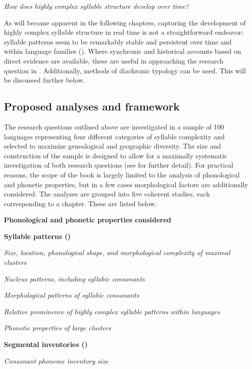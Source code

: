 \ea\label{ex:1.24}
   \textit{How does highly complex syllable structure develop over time?}
\z

  As will become apparent in the following chapters, capturing the development of highly complex syllable structure in real time is not a straightforward endeavor: syllable patterns seem to be remarkably stable and persistent over time and within language families (\citealt{NapoleãodeSouza2017}). Where synchronic and historical accounts based on direct evidence are available, these are useful in approaching the research question in . Additionally, methods of diachronic typology can be used. This will be discussed further below.

\subsection{Proposed analyses and framework}\label{sec:1.4.2}

  The research questions outlined above are investigated in a sample of 100 languages representing four different categories of syllable complexity and selected to maximize genealogical and geographic diversity. The size and construction of the sample is designed to allow for a maximally systematic investigation of both research questions (see  for further detail). For practical reasons, the scope of the book is largely limited to the analysis of phonological and phonetic properties, but in a few cases morphological factors are additionally considered. The analyses are grouped into five coherent studies, each corresponding to a chapter. These are listed below.

\ea\label{ex:1.25}
\textbf{Phonological and phonetic properties considered}

\textbf{Syllable patterns ()}

\textit{Size, location, phonological shape, and morphological complexity of maximal clusters}

\textit{Nucleus patterns, including syllabic consonants}

\textit{Morphological patterns of syllabic consonants}

\textit{Relative prominence of highly complex syllable patterns within languages}

\textit{Phonetic properties of large clusters}

\textbf{Segmental inventories ()}

\textit{Consonant phoneme inventory size}


